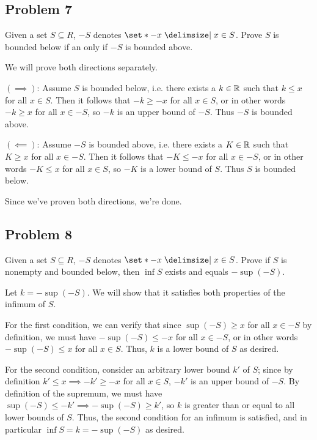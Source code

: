 \documentclass[main.tex]{subfiles}
\begin{document}
\subsection{Problem 7}
\begin{claim}
    Given a set $S \subseteq R$, $-S$ denotes $\set*{-x \mid x \in S}$. Prove $S$ is bounded below if an only if $-S$ is bounded above.
\end{claim}

\begin{soln}
    We will prove both directions separately.

    $(\implies)$: Assume $S$ is bounded below, i.e. there exists a $k\in \mathbb R$ such that $k \le x$ for all $x\in S$. Then it follows that $-k\ge -x$ for all $x\in S$, or in other words $-k\ge x$ for all $x\in -S$, so $-k$ is an upper bound of $-S$. Thus $-S$ is bounded above.

    $(\impliedby)$: Assume $-S$ is bounded above, i.e. there exists a $K\in \mathbb R$ such that $K\ge x$ for all $x\in -S$. Then it follows that $-K\le -x$ for all $x\in -S$, or in other words $-K\le x$ for all $x\in S$, so $-K$ is a lower bound of $S$. Thus $S$ is bounded below.

    Since we've proven both directions, we're done.
\end{soln}
\eject

\subsection{Problem 8}
\begin{claim}
    Given a set $S \subseteq R$, $-S$ denotes $\set*{-x \mid x \in S}$. Prove if $S$ is nonempty and bounded below, then $\inf S$ exists and equals $-\sup(-S)$.
\end{claim}

\begin{soln}
    Let $k = -\sup (-S)$. We will show that it satisfies both properties of the infimum of $S$.
    
    For the first condition, we can verify that since $\sup(-S)\ge x$ for all $x\in -S$ by definition, we must have $-\sup(-S)\le -x$ for all $x\in -S$, or in other words $-\sup(-S)\le x$ for all $x\in S$. Thus, $k$ is a lower bound of $S$ as desired.
    
    For the second condition, consider an arbitrary lower bound $k'$ of $S$; since by definition $k'\le x\implies -k'\ge -x$ for all $x\in S$, $-k'$ is an upper bound of $-S$. By definition of the supremum, we must have $\sup(-S)\le -k'\implies -\sup(-S)\ge k'$, so $k$ is greater than or equal to all lower bounds of $S$. Thus, the second condition for an infimum is satisfied, and in particular $\inf S = k = -\sup (-S)$ as desired.
\end{soln}
\eject
\end{document}
